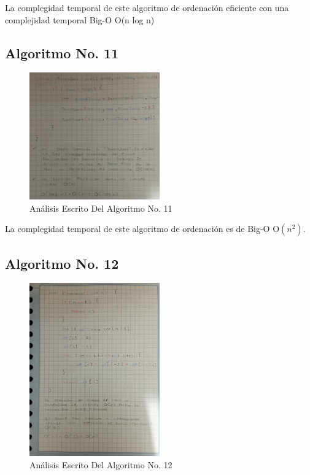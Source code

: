 \documentclass[journal, spanish]{IEEEtran}
\begin{document}
La complegidad temporal de este algoritmo de ordenación eficiente con una complejidad temporal Big-O O(n log n)

\subsection{Algoritmo No. 11}

\begin{figure}[H]
  \centering
  \includegraphics[width=0.5\textwidth]{images/IMG_20230913_023605~2.jpg}
  \caption{Análisis Escrito Del Algoritmo No. 11}
  \label{fig:nombre_de_tu_imagen}
\end{figure}

La complegidad temporal de este algoritmo de ordenación es de Big-O O$(n^2)$.

\subsection{Algoritmo No. 12}

\begin{figure}[H]
  \centering
  \includegraphics[width=0.5\textwidth]{images/IMG_20230913_023612.jpg}
  \caption{Análisis Escrito Del Algoritmo No. 12}
  \label{fig:nombre_de_tu_imagen}
\end{figure}
\end{document}
